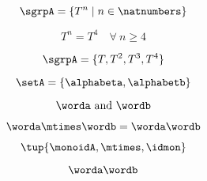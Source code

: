   
  $$\sgrpA = \{ T^n \mid n \in \natnumbers \}$$
  
$$ T^n = T^4 \quad \forall \ n \geq 4 $$

  $$\sgrpA = \{T, T^2, T^3, T^4 \}$$
  
  $$  \setA = \{ \alphabeta, \alphabetb \}$$
  
  \begin{equation*}
    \worda \text{ and } \wordb
  \end{equation*}

  \begin{equation*}  \label{eq:string-semigroup-wordab}
    \worda \mtimes  \wordb =  \worda \wordb
  \end{equation*}
  
  
  $$ \tup{ \monoidA, \mtimes, \idmon} $$


  \begin{equation*} \label{eq:string-semigroup-wordab-concat}
     \worda \wordb
  \end{equation*}

  
